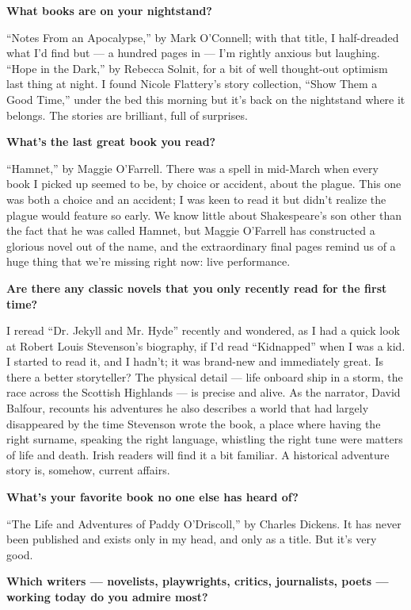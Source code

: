 \textbf{What books are on your nightstand?}

``Notes From an Apocalypse,'' by Mark O'Connell; with that title, I
half-dreaded what I'd find but --- a hundred pages in --- I'm rightly
anxious but laughing. ``Hope in the Dark,'' by Rebecca Solnit, for a bit
of well thought-out optimism last thing at night. I found Nicole
Flattery's story collection, ``Show Them a Good Time,'' under the bed
this morning but it's back on the nightstand where it belongs. The
stories are brilliant, full of surprises.

\textbf{What's the last great book you read?}

``Hamnet,'' by Maggie O'Farrell. There was a spell in mid-March when
every book I picked up seemed to be, by choice or accident, about the
plague. This one was both a choice and an accident; I was keen to read
it but didn't realize the plague would feature so early. We know little
about Shakespeare's son other than the fact that he was called Hamnet,
but Maggie O'Farrell has constructed a glorious novel out of the name,
and the extraordinary final pages remind us of a huge thing that we're
missing right now: live performance.

\textbf{Are there any classic novels that you only recently read for the
first time?}

I reread ``Dr. Jekyll and Mr. Hyde'' recently and wondered, as I had a
quick look at Robert Louis Stevenson's biography, if I'd read
``Kidnapped'' when I was a kid. I started to read it, and I hadn't; it
was brand-new and immediately great. Is there a better storyteller? The
physical detail --- life onboard ship in a storm, the race across the
Scottish Highlands --- is precise and alive. As the narrator, David
Balfour, recounts his adventures he also describes a world that had
largely disappeared by the time Stevenson wrote the book, a place where
having the right surname, speaking the right language, whistling the
right tune were matters of life and death. Irish readers will find it a
bit familiar. A historical adventure story is, somehow, current affairs.

\textbf{What's your favorite book no one else has heard of?}

``The Life and Adventures of Paddy O'Driscoll,'' by Charles Dickens. It
has never been published and exists only in my head, and only as a
title. But it's very good.

\textbf{Which writers --- novelists, playwrights, critics, journalists,
poets --- working today do you admire most?}

